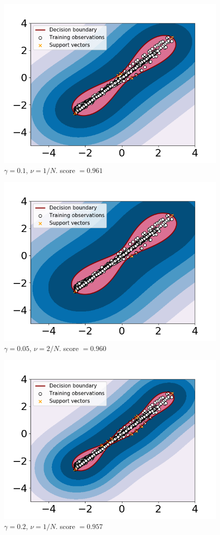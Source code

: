     \begin{figure}
        \centering
        \includegraphics[width = .7\textwidth]{report/figures/analysis/gridsearch/Novelty detection, 3 training, gamma = 0.1 nu = 0.00010583130489998942.png}
        \caption{$\gamma = 0.1$, $\nu = 1/N$. score $=0.961$}
        \label{fig:my_label}
    \end{figure}
    
    \begin{figure}
        \centering
        \includegraphics[width = .7\textwidth]{report/figures/analysis/gridsearch/Novelty detection, 4 training, gamma = 0.05 nu = 0.00021166260979997884.png}
        \caption{$\gamma = 0.05$, $\nu = 2/N$. score $=0.960$}
        \label{fig:my_label}
    \end{figure}
    
    \begin{figure}
        \centering
        \includegraphics[width = .7\textwidth]{report/figures/analysis/gridsearch/Novelty detection, 5 training, gamma = 0.2 nu = 0.00010583130489998942.png}
        \caption{$\gamma = 0.2$, $\nu = 1/N$. score $=0.957$}
        \label{fig:my_label}
    \end{figure}
    
